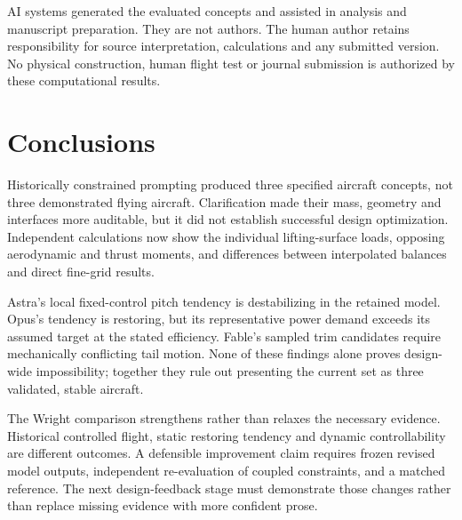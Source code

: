 \documentclass[11pt,a4paper]{article}
\begin{document}
AI systems generated the evaluated concepts and assisted in analysis and manuscript preparation. They are not authors. The human author retains responsibility for source interpretation, calculations and any submitted version. No physical construction, human flight test or journal submission is authorized by these computational results.

\section{Conclusions}
Historically constrained prompting produced three specified aircraft concepts, not three demonstrated flying aircraft. Clarification made their mass, geometry and interfaces more auditable, but it did not establish successful design optimization. Independent calculations now show the individual lifting-surface loads, opposing aerodynamic and thrust moments, and differences between interpolated balances and direct fine-grid results.

Astra's local fixed-control pitch tendency is destabilizing in the retained model. Opus's tendency is restoring, but its representative power demand exceeds its assumed target at the stated efficiency. Fable's sampled trim candidates require mechanically conflicting tail motion. None of these findings alone proves design-wide impossibility; together they rule out presenting the current set as three validated, stable aircraft.

The Wright comparison strengthens rather than relaxes the necessary evidence. Historical controlled flight, static restoring tendency and dynamic controllability are different outcomes. A defensible improvement claim requires frozen revised model outputs, independent re-evaluation of coupled constraints, and a matched reference. The next design-feedback stage must demonstrate those changes rather than replace missing evidence with more confident prose.

\begingroup\raggedright

\endgroup
\end{document}
